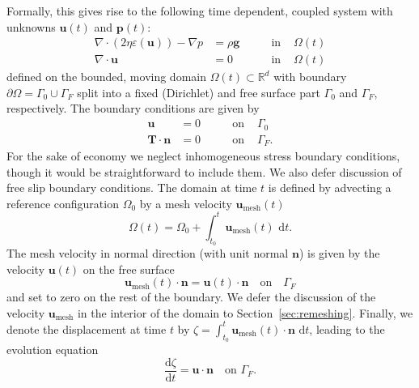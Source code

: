 \documentclass[preprint,12pt,authoryear]{elsarticle}
\begin{document}
Formally, this gives rise to the following time dependent, coupled system with unknowns $\mathbf{u}(t)$ and $\mathbf{p}(t)$:
\begin{equation}
\begin{aligned}
\nabla \cdot \left( 2 \eta \varepsilon( \mathbf{u} ) \right) - \nabla p &= \rho \mathbf{g} \qquad &\text{in } &\Omega(t)\\
\nabla \cdot \mathbf{u} &= 0  \qquad &\text{in } &\Omega(t)
\end{aligned}
\label{eq:final_system}
\end{equation}
defined on the bounded, moving domain $\Omega(t)\subset \mathbb{R}^d$ with boundary $\partial \Omega = \Gamma_0 \cup \Gamma_F$
split into a fixed (Dirichlet) and free surface part $\Gamma_0$ and $\Gamma_F$, respectively.
The boundary conditions are given by
\begin{equation}
\begin{aligned}
\mathbf{u} &= 0 &\qquad \text{on } &\Gamma_0 \\
\mathbf{T}\cdot \mathbf{n} &= 0 &\qquad \text{on } &\Gamma_F.
\end{aligned}
\end{equation}
For the sake of economy we neglect inhomogeneous stress boundary conditions, though it would be straightforward to include them.
We also defer discussion of free slip boundary conditions.
The domain at time $t$ is defined by advecting a reference configuration $\Omega_0$ by a mesh velocity $\mathbf{u}_{\mathrm{mesh}}(t)$
\begin{equation}
 \Omega(t) = \Omega_0 + \int_{t_0}^t \mathbf{u}_{\mathrm{mesh}}(t) \text{ d}t.
\end{equation}
The mesh velocity in normal direction (with unit normal $\mathbf{n}$) is given by the velocity $\mathbf{u}(t)$ on the free surface
\begin{equation}
 \mathbf{u}_\mathrm{mesh}(t) \cdot \mathbf{n} = \mathbf{u}(t) \cdot \mathbf{n} \quad \text{on} \quad \Gamma_F
\end{equation}
and set to zero on the rest of the boundary. We defer the discussion of the velocity $\mathbf{u}_\mathrm{mesh}$ in the interior of the domain
to Section~\ref{sec:remeshing}.
Finally, we denote the displacement at time $t$ by $\zeta = \int_{t_0}^t \mathbf{u}_\mathrm{mesh}(t)\cdot \mathbf{n} \text{ d}t$, leading to the evolution
equation
\begin{equation}
\frac{\text{d} \zeta}{\text{d}t} = \mathbf{u \cdot \mathbf{n}} \quad \textrm{on  }  \Gamma_F.
\label{eq:surface_evolution}
\end{equation}
\end{document}
